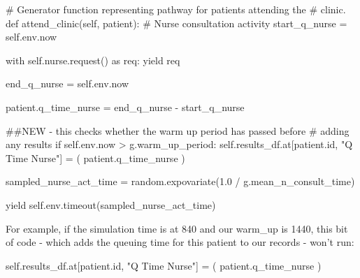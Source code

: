 \documentclass[
  letterpaper,
  DIV=11,
  numbers=noendperiod]{scrreprt}
\newenvironment{Shaded}{}{}
\newcommand{\BuiltInTok}[1]{\textcolor[rgb]{0.84,0.23,0.29}{#1}}
\newcommand{\CommentTok}[1]{\textcolor[rgb]{0.42,0.45,0.49}{#1}}
\newcommand{\ControlFlowTok}[1]{\textcolor[rgb]{0.84,0.23,0.29}{#1}}
\newcommand{\FloatTok}[1]{\textcolor[rgb]{0.00,0.36,0.77}{#1}}
\newcommand{\ImportTok}[1]{\textcolor[rgb]{0.01,0.18,0.38}{#1}}
\newcommand{\KeywordTok}[1]{\textcolor[rgb]{0.84,0.23,0.29}{#1}}
\newcommand{\NormalTok}[1]{\textcolor[rgb]{0.14,0.16,0.18}{#1}}
\newcommand{\OperatorTok}[1]{\textcolor[rgb]{0.14,0.16,0.18}{#1}}
\newcommand{\StringTok}[1]{\textcolor[rgb]{0.01,0.18,0.38}{#1}}
\newcommand{\VariableTok}[1]{\textcolor[rgb]{0.89,0.38,0.04}{#1}}
\begin{document}
\label{attend_clinic_func}
\begin{Shaded}
\begin{Highlighting}[]
\CommentTok{\# Generator function representing pathway for patients attending the}
\CommentTok{\# clinic.}
\KeywordTok{def}\NormalTok{ attend\_clinic(}\VariableTok{self}\NormalTok{, patient):}
    \CommentTok{\# Nurse consultation activity}
\NormalTok{    start\_q\_nurse }\OperatorTok{=} \VariableTok{self}\NormalTok{.env.now}

    \ControlFlowTok{with} \VariableTok{self}\NormalTok{.nurse.request() }\ImportTok{as}\NormalTok{ req:}
        \ControlFlowTok{yield}\NormalTok{ req}

\NormalTok{        end\_q\_nurse }\OperatorTok{=} \VariableTok{self}\NormalTok{.env.now}

\NormalTok{        patient.q\_time\_nurse }\OperatorTok{=}\NormalTok{ end\_q\_nurse }\OperatorTok{{-}}\NormalTok{ start\_q\_nurse}

        \CommentTok{\#\#NEW {-} this checks whether the warm up period has passed before}
        \CommentTok{\# adding any results}
        \ControlFlowTok{if} \VariableTok{self}\NormalTok{.env.now }\OperatorTok{\textgreater{}}\NormalTok{ g.warm\_up\_period:}
            \VariableTok{self}\NormalTok{.results\_df.at[patient.}\BuiltInTok{id}\NormalTok{, }\StringTok{"Q Time Nurse"}\NormalTok{] }\OperatorTok{=}\NormalTok{ (}
\NormalTok{                patient.q\_time\_nurse}
\NormalTok{            )}

\NormalTok{        sampled\_nurse\_act\_time }\OperatorTok{=}\NormalTok{ random.expovariate(}\FloatTok{1.0} \OperatorTok{/}
\NormalTok{                                                    g.mean\_n\_consult\_time)}

        \ControlFlowTok{yield} \VariableTok{self}\NormalTok{.env.timeout(sampled\_nurse\_act\_time)}
\end{Highlighting}
\end{Shaded}

For example, if the simulation time is at 840 and our warm\_up is 1440,
this bit of code - which adds the queuing time for this patient to our
records - won't run:

\label{warm_up_bypassed_code}
\begin{Shaded}
\begin{Highlighting}[]
\VariableTok{self}\NormalTok{.results\_df.at[patient.}\BuiltInTok{id}\NormalTok{, }\StringTok{"Q Time Nurse"}\NormalTok{] }\OperatorTok{=}\NormalTok{ (}
\NormalTok{    patient.q\_time\_nurse}
\NormalTok{)}
\end{Highlighting}
\end{Shaded}
\end{document}
